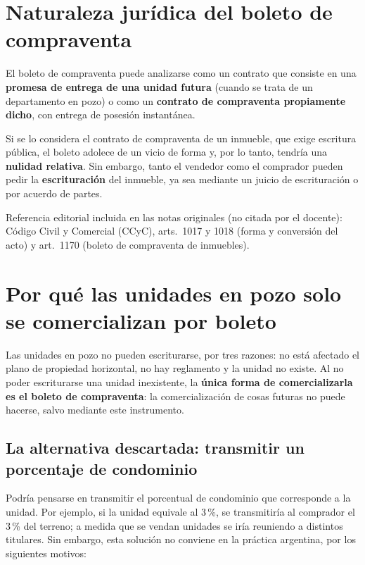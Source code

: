 \documentclass[12pt,oneside]{book}
\begin{document}
\section{Naturaleza jurídica del boleto de compraventa}

El boleto de compraventa puede analizarse como un contrato que consiste en una \textbf{promesa de entrega de una unidad futura} (cuando se trata de un departamento en pozo) o como un \textbf{contrato de compraventa propiamente dicho}, con entrega de posesión instantánea.

Si se lo considera el contrato de compraventa de un inmueble, que exige escritura pública, el boleto adolece de un vicio de forma y, por lo tanto, tendría una \textbf{nulidad relativa}. Sin embargo, tanto el vendedor como el comprador pueden pedir la \textbf{escrituración} del inmueble, ya sea mediante un juicio de escrituración o por acuerdo de partes.

\begin{note}
Referencia editorial incluida en las notas originales (no citada por el docente): Código Civil y Comercial (CCyC), arts.~1017 y 1018 (forma y conversión del acto) y art.~1170 (boleto de compraventa de inmuebles).
\end{note}

\section{Por qué las unidades en pozo solo se comercializan por boleto}

Las unidades en pozo no pueden escriturarse, por tres razones: no está afectado el plano de propiedad horizontal, no hay reglamento y la unidad no existe. Al no poder escriturarse una unidad inexistente, la \textbf{única forma de comercializarla es el boleto de compraventa}: la comercialización de cosas futuras no puede hacerse, salvo mediante este instrumento.

\subsection{La alternativa descartada: transmitir un porcentaje de condominio}

Podría pensarse en transmitir el porcentual de condominio que corresponde a la unidad. Por ejemplo, si la unidad equivale al 3\,\%, se transmitiría al comprador el 3\,\% del terreno; a medida que se vendan unidades se iría reuniendo a distintos titulares. Sin embargo, esta solución no conviene en la práctica argentina, por los siguientes motivos:
\end{document}
